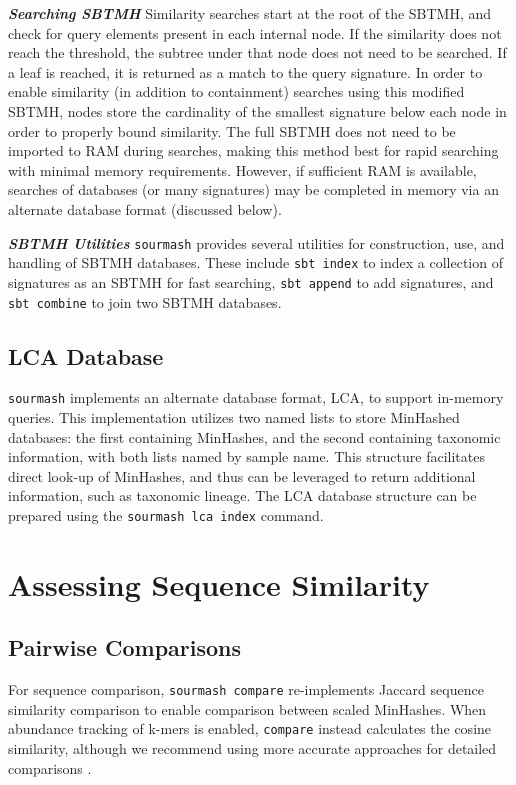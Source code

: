 \documentclass[10pt,a4paper,twocolumn]{article}
\begin{document}
\textit{\textbf{Searching SBTMH}} Similarity searches start at the root of the SBTMH, and check for query elements present in each internal node. If the similarity does not reach the threshold, the subtree under that node does not need to be searched. If a leaf is reached, it is returned as a match to the query signature. In order to enable similarity (in addition to containment) searches using this modified SBTMH, nodes store the cardinality of the smallest signature below each node in order to properly bound similarity. The full SBTMH does not need to be imported to RAM during searches, making this method best for rapid searching with minimal memory requirements. However, if sufficient RAM is available, searches of databases (or many signatures) may be completed in memory via an alternate database format (discussed below). 

\textit{\textbf{SBTMH Utilities}} \lstinline{sourmash} provides several utilities for construction, use, and handling of SBTMH databases. These include \lstinline{sbt index} to index a collection of signatures as an SBTMH for fast searching, \lstinline{sbt append} to add signatures, and \lstinline{sbt combine} to join two SBTMH databases.


\subsection*{LCA Database}

\lstinline{sourmash} implements an alternate database format, LCA, to support in-memory queries. This implementation utilizes two named lists to store MinHashed databases: the first containing MinHashes, and the second containing taxonomic information, with both lists named by sample name. This structure facilitates direct look-up of MinHashes, and thus can be leveraged to return additional information, such as taxonomic lineage. The LCA database structure can be prepared using the \lstinline{sourmash lca index} command.

\section*{Assessing Sequence Similarity}

\subsection*{Pairwise Comparisons}

For sequence comparison, \lstinline{sourmash compare} re-implements Jaccard sequence similarity comparison to enable comparison between scaled MinHashes. When abundance tracking of k-mers is enabled, \lstinline{compare} instead calculates the cosine similarity, although we recommend using more accurate approaches for detailed comparisons \cite{rowe2019streaming}.
\end{document}
